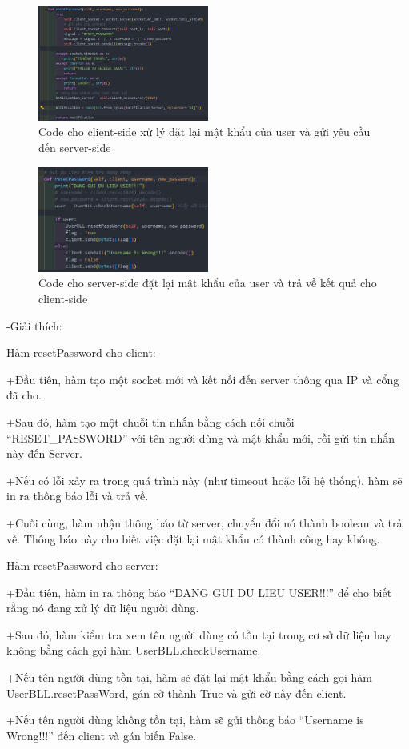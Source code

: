 \documentclass[a4paper]{article}
\begin{document}
\begin{flushleft}
	\begin{figure}
		\centering
		\includegraphics[width=0.5\textwidth]{images/resetPassword-client.png}
		\caption{Code cho client-side xử lý đặt lại mật khẩu của user và gửi yêu cầu đến server-side}
	\end{figure}

	\begin{figure}
		\centering
		\includegraphics[width=0.5\textwidth]{images/resetPassword-server.png}
		\caption{Code cho server-side đặt lại mật khẩu của user và trả về kết quả cho client-side}
	\end{figure}

	-Giải thích:

	Hàm resetPassword cho client:

	+Đầu tiên, hàm tạo một socket mới và kết nối đến server thông qua IP và cổng đã cho.

	+Sau đó, hàm tạo một chuỗi tin nhắn bằng cách nối chuỗi ``RESET\_PASSWORD'' với tên người dùng và mật khẩu mới, rồi gửi tin nhắn này đến Server.

	+Nếu có lỗi xảy ra trong quá trình này (như timeout hoặc lỗi hệ thống), hàm sẽ in ra thông báo lỗi và trả về.

	+Cuối cùng, hàm nhận thông báo từ server, chuyển đổi nó thành boolean và trả về. Thông báo này cho biết việc đặt lại mật khẩu có thành công hay không.

	Hàm resetPassword cho server:

	+Đầu tiên, hàm in ra thông báo “DANG GUI DU LIEU USER!!!” để cho biết rằng nó đang xử lý dữ liệu người dùng.

	+Sau đó, hàm kiểm tra xem tên người dùng có tồn tại trong cơ sở dữ liệu hay không bằng cách gọi hàm UserBLL.checkUsername.

	+Nếu tên người dùng tồn tại, hàm sẽ đặt lại mật khẩu bằng cách gọi hàm UserBLL.resetPassWord, gán cờ thành True và gửi cờ này đến client.

	+Nếu tên người dùng không tồn tại, hàm sẽ gửi thông báo “Username is Wrong!!!” đến client và gán biến False.
\end{flushleft}
\end{document}
